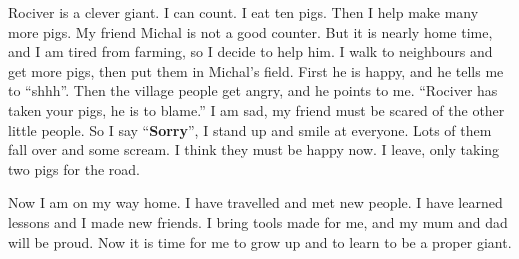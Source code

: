 {	Rociver is a clever giant. I can count. I eat ten pigs. Then I help make many more pigs. My friend Michal is not a good counter. But it is nearly home time, and I am tired from farming, so I decide to help him. I walk to neighbours and get more pigs, then put them in Michal's field. First he is happy, and he tells me to \enquote{shhh}. Then the village people get angry, and he points to me. \enquote{Rociver has taken your pigs, he is to blame.} I am sad, my friend must be scared of the other little people. So I say \enquote{\textbf{Sorry}}, I stand up and smile at everyone. Lots of them fall over and some scream. I think they must be happy now. I leave, only taking two pigs for the road.%

	Now I am on my way home. I have travelled and met new people. I have learned lessons and I made new friends. I bring tools made for me, and my mum and dad will be proud. Now it is time for me to grow up and to learn to be a proper giant.%
}

